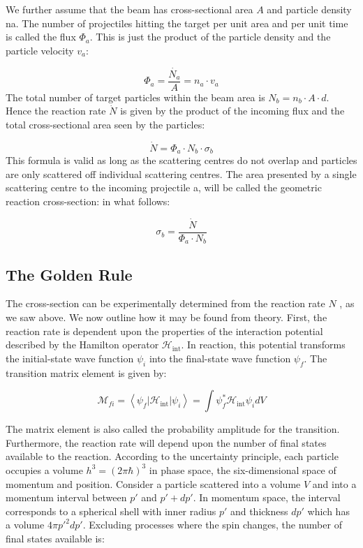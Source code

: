 \documentclass[10pt,a4paper]{article}
\newcounter{theo}
\newcommand{\mbraket}[3]{\left\langle #1 \vert #2 \vert #3 \right\rangle}
\newcommand{\hamiltonian}{\mathcal{H}}
\begin{document}
We further assume that the beam has cross-sectional area $A$ and particle density na. The number of projectiles hitting the target per unit area and per unit time is called the flux $\Phi_a$. This is just the product of the particle density and the particle velocity $v_a$:

\begin{equation}
    \Phi_a = \frac{\dot{N_a}}{A}=n_a\cdot v_a
\end{equation}
The total number of target particles within the beam area is $N_b = n_b\cdot A\cdot d$. Hence the reaction rate $\dot{N}$ is given by the product of the incoming flux and the total cross-sectional area seen by the particles:

\begin{equation} 
    \dot{N}=\Phi_a\cdot N_b \cdot \sigma_b
\end{equation}
This formula is valid as long as the scattering centres do not overlap and particles are only scattered off individual scattering centres. The area presented by a single scattering centre to the incoming projectile a, will be called the geometric reaction cross-section: in what follows:

\begin{equation}
    \sigma_b = \frac{\dot{N}}{\Phi_a\cdot N_b}
\end{equation}

\subsection{{The Golden Rule}}
The cross-section can be experimentally determined from the reaction rate $N$ , as we saw above. We now outline how it may be found from theory.
First, the reaction rate is dependent upon the properties of the interaction potential described by the Hamilton operator $\hamiltonian_{\text{int}}$. In reaction, this potential transforms the initial-state wave function $\psi_i$ into the final-state wave function $\psi_f$. The transition matrix element is given by:

\begin{equation}
    \mathcal{M}_{fi} = \mbraket{\psi_f}{\hamiltonian_{\text{int}}}{\psi_i} = \int \psi_f^*\hamiltonian_{\text{int}} \psi_i dV 
\end{equation}

The matrix element is also called the probability amplitude for the transition. Furthermore, the reaction rate will depend upon the number of final states available to the reaction. According to the uncertainty principle, each particle occupies a volume $h^3 = (2\pi\hbar)^3$ in phase space, the six-dimensional space of momentum and position. Consider a particle scattered into a volume $V$ and into a momentum interval between $p'$ and $p' + dp'$. In momentum space, the interval corresponds to a spherical shell with inner radius $p'$ and thickness $dp'$ which has a volume $4\pi p'^2dp'$. Excluding processes where the spin changes, the number of final states available is:
\end{document}
